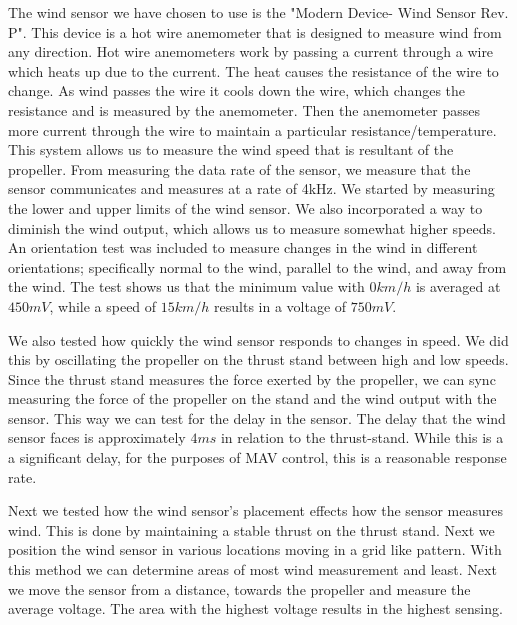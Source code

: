 \documentclass[twocolumn]{article}
\begin{document}
	The wind sensor we have chosen to use is the "Modern Device- Wind Sensor Rev. P". This device is a hot wire anemometer that is designed to measure wind from any direction. Hot wire anemometers work by passing a current through a wire which heats up due to the current. The heat causes the resistance of the wire to change. As wind passes the wire it cools down the wire, which changes the resistance and is measured by the anemometer. Then the anemometer passes more current through the wire to maintain a particular resistance/temperature. This system allows us to measure the wind speed that is resultant of the propeller. From measuring the data rate of the sensor, we measure that the sensor communicates and measures at a rate of 4kHz. We started by measuring the lower and upper limits of the wind sensor. We also incorporated a way to diminish the wind output, which allows us to measure somewhat higher speeds. An orientation test was included to measure changes in the wind in different orientations; specifically normal to the wind, parallel to the wind, and away from the wind. The test shows us that the minimum value with $0 km/h$ is averaged at $450 mV$, while a speed of $15 km/h$ results in a voltage of $750 mV$.
	
	
	We also tested how quickly the wind sensor responds to changes in speed. We did this by oscillating the propeller on the thrust stand between high and low speeds. Since the thrust stand measures the force exerted by the propeller, we can sync measuring the force of the propeller on the stand and the wind output with the sensor. This way we can test for the delay in the sensor. The delay that the wind sensor faces is approximately $4ms$ in relation to the thrust-stand. While this is a a significant delay, for the purposes of MAV control, this is a reasonable response rate. 
	
	
	Next we tested how the wind sensor's placement effects how the sensor measures wind. This is done by maintaining a stable thrust on the thrust stand. Next we position the wind sensor in various locations moving in a grid like pattern. With this method we can determine areas of most wind measurement and least. Next we move the sensor from a distance, towards the propeller and measure the average voltage. The area with the highest voltage results in the highest sensing. 
	
\end{document}
